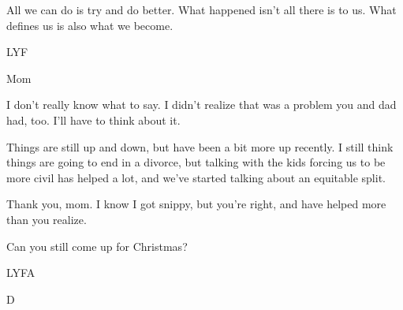 All we can do is try and do better. What happened isn't all there is to us. What defines us is also what we become.

LYF

Mom

\secdiv{}

\noindent I don't really know what to say. I didn't realize that was a problem you and dad had, too. I'll have to think about it.

Things are still up and down, but have been a bit more up recently. I still think things are going to end in a divorce, but talking with the kids forcing us to be more civil has helped a lot, and we've started talking about an equitable split.

Thank you, mom. I know I got snippy, but you're right, and have helped more than you realize.

Can you still come up for Christmas?

LYFA

D
